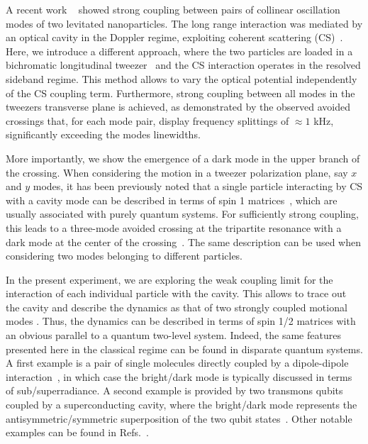 \documentclass[aps,preprint,singlecolumn,nopacs,superscriptaddress,groupedaddress]{revtex4}
\begin{document}
A recent work ~\cite{Vijayan2024Cavity-mediated} showed strong coupling between pairs of collinear oscillation modes of two levitated nanoparticles. The long range interaction was mediated by an optical cavity in the Doppler regime, exploiting coherent scattering (CS)~\cite{Vuletic2000Laser,novotny_CS_2019,Delic_CS_2019,toros2020Quantum,toros2021Coherent}.
Here, we introduce a different approach, where the two particles are loaded in a bichromatic longitudinal tweezer~\cite{Deplano2024Coulomb}  and the CS interaction operates in the resolved sideband regime. 
This method allows to vary the optical potential independently of the CS coupling term. Furthermore, strong coupling between all modes in the tweezers transverse plane is achieved, as demonstrated by the observed avoided crossings that, for each mode pair, display frequency splittings of $\approx 1$ kHz, significantly exceeding the modes linewidths.

More importantly, we show the emergence of a dark mode in the upper branch of the crossing. 
When considering the motion in a tweezer polarization plane, say $x$ and $y$ modes, it has been previously noted that a single particle interacting by CS with a cavity mode can be described in terms of spin 1 matrices~\cite{toros2021Coherent}, which are usually associated with purely quantum systems. For sufficiently strong coupling, this leads to a three-mode avoided crossing at the tripartite resonance with a dark mode at the center of the crossing~\cite{Ranfagni2021Vectorial}. The same description can be used when considering two modes belonging to different particles.

In the present experiment, we are exploring the weak coupling limit for the interaction of each individual particle with the cavity. This allows to trace out the cavity and describe the dynamics as that of two strongly coupled motional modes \cite{Vijayan2024Cavity-mediated}. Thus, the dynamics can be described in terms of spin 1/2 matrices with an obvious parallel to a quantum two-level system. Indeed, the same features presented here in the classical regime can be found in disparate quantum systems. A first example is a pair of single molecules directly coupled by a dipole-dipole interaction~\cite{Trebbia2022Tailoring}, in which case the bright/dark mode is typically discussed in terms of sub/superradiance. A second example is provided by two transmons qubits coupled by a superconducting cavity, where the bright/dark mode represents the antisymmetric/symmetric superposition of the two qubit states~\cite{Majer2007Couplingsuperconducting}. Other notable examples can be found in Refs.~\cite{Evans2018Photon-mediated,Filipp2011Multimode,Leseleuc2017Optical}.
\end{document}
